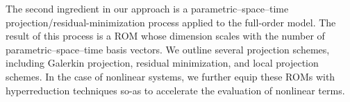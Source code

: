 \documentclass[3p,computermodern,10pt]{elsarticle}
\begin{document}

The second ingredient in our approach is a parametric--space--time projection/residual-minimization process applied to the full-order model. The result of this process is a ROM whose dimension scales with the number of parametric--space--time basis vectors. We outline several projection schemes, including Galerkin projection, residual minimization, and local projection schemes. In the case of nonlinear systems, we further equip these ROMs with hyperreduction techniques so-as to accelerate the evaluation of nonlinear terms. 
\end{document}
